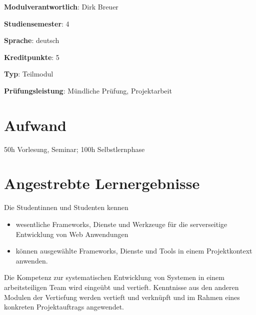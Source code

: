 \begin{modulHead}
\textbf{Modulverantwortlich}: Dirk
Breuer
\end{modulHead}
\begin{modulHead}
\textbf{Studiensemester}:
4
\end{modulHead}
\begin{modulHead}
\textbf{Sprache}:
deutsch
\end{modulHead}
\begin{modulHead}
\textbf{Kreditpunkte}:
5
\end{modulHead}
\begin{modulHead}
\textbf{Typ}:
Teilmodul
\end{modulHead}
\begin{modulHead}
\textbf{Prüfungsleistung}:
Mündliche Prüfung, Projektarbeit
\end{modulHead}


\hypertarget{aufwandpathlabelmi-2017modulbeschreibungen-bachelorba_wd_frameworks-daten-und-dienste}{%
\section*{Aufwand\label{/mi-2017/modulbeschreibungen-bachelor/BA_WD_Frameworks-daten-und-dienste}}\label{aufwandpathlabelmi-2017modulbeschreibungen-bachelorba_wd_frameworks-daten-und-dienste}}

50h Vorlesung, Seminar; 100h Selbstlernphase

\hypertarget{angestrebte-lernergebnissepathlabelmi-2017modulbeschreibungen-bachelorba_wd_frameworks-daten-und-dienste}{%
\section*{Angestrebte
Lernergebnisse\label{/mi-2017/modulbeschreibungen-bachelor/BA_WD_Frameworks-daten-und-dienste}}\label{angestrebte-lernergebnissepathlabelmi-2017modulbeschreibungen-bachelorba_wd_frameworks-daten-und-dienste}}

Die Studentinnen und Studenten kennen

\begin{itemize}
\tightlist
\item
  wesentliche Frameworks, Dienste und Werkzeuge für die serverseitige
  Entwicklung von Web Anwendungen
\item
  können ausgewählte Frameworks, Dienste und Tools in einem
  Projektkontext anwenden.
\end{itemize}

Die Kompetenz zur systematischen Entwicklung von Systemen in einem
arbeitsteiligen Team wird eingeübt und vertieft. Kenntnisse aus den
anderen Modulen der Vertiefung werden vertieft und verknüpft und im
Rahmen eines konkreten Projektauftrags angewendet.

